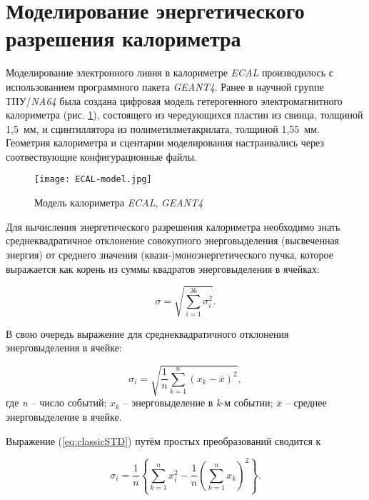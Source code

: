 \newpage
 \section{Моделирование энергетического разрешения калориметра}  \label{chap5}  
 
 Моделирование электронного ливня в калориметре \textit{ECAL} производилось с использованием программного пакета \textit{GEANT4}. Ранее в научной группе ТПУ/\textit{NA64} была создана цифровая модель гетерогенного электромагнитного калориметра (рис. \ref{fig:ecal}), состоящего из чередующихся пластин из свинца, толщиной \mbox{1,5 мм}, и сцинтиллятора из полиметилметакрилата, толщиной \mbox{1,55 мм}. Геометрия калориметра и сцентарии моделирования настраивались через соотвествующие конфигурационные файлы. 
 
\begin{figure}[H]
    \centering
    \texttt{[image: ECAL-model.jpg]}
    \caption{Модель калориметра \textit{ECAL}, \textit{GEANT4}}
    \label{fig:ecal}
\end{figure}

Для вычисления энергетического разрешения калориметра необходимо знать среднеквадратичное отклонение совокупного энерговыделения (высвеченная энергия) от среднего значения (квази-)моноэнергетического пучка, которое выражается как корень из суммы квадратов энерговыделения в ячейках:

\begin{equation}\label{eq:sigmaCal}
\sigma = \sqrt{\sum_{i=1}^{36} \sigma_i^2} .
\end{equation}

В свою очередь выражение для среднеквадратичного отклонения энерговыделения в ячейке: 

\begin{equation}\label{eq:classicSTD}
\sigma_i = \sqrt{\frac{1}{n} \sum_{k=1}^n (x_k - \bar{x})^2},
\end{equation}
где \textit{n} -- число событий; $x_k$ -- энерговыделение в \textit{k}-м событии; $\bar{x}$ -- среднее энерговыделение в ячейке.

Выражение (\ref{eq:classicSTD}) путём простых преобразований сводится к 

\begin{equation}\label{eq:mySTD}
\sigma_i = \frac{1}{n} 
\left\{ 
\sum_{k=1}^n x_i^2 - \frac{1}{n} 
\left(
 \sum_{k=1}^n x_k \right) ^2 
\right\} .
\end{equation}

